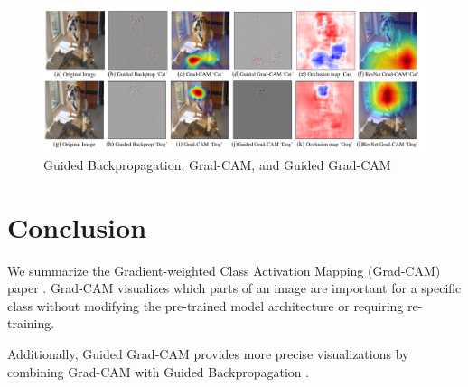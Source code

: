\documentclass[extendedabs]{bmvc2k}
\begin{document}
\begin{figure}[t]
\centering
	\includegraphics[width=\linewidth]{images/fig2.PNG}
	\caption{
		Guided Backpropagation, Grad-CAM, and Guided Grad-CAM}
	\vspace{-2mm}
        \label{fig:gradcamguidedgradcam}
\end{figure}

\section{Conclusion}
We summarize the Gradient-weighted Class Activation Mapping (Grad-CAM) paper \cite{gradcam}. Grad-CAM visualizes which parts of an image are important for a specific class without modifying the pre-trained model architecture or requiring re-training. 

Additionally, Guided Grad-CAM provides more precise visualizations by combining Grad-CAM with Guided Backpropagation \cite{guidedbackprop}.

\newpage

\end{document}
